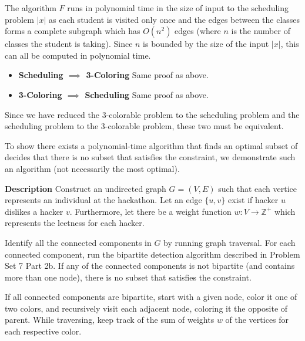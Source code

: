 \documentclass[12pt,twoside]{article}
\begin{document}
\begin{problems}
\begin{problemparts}
\begin{itemize}
  The algorithm $F$ runs in polynomial time in the size of input to the
  scheduling problem $|x|$ as each student is visited only once and the edges
  between the classes forms a complete subgraph which has $O(n^2)$ edges
  (where $n$ is the number of classes the student is taking). Since $n$ is
  bounded by the size of the input $|x|$, this can all be computed in
  polynomial time.

  \begin{itemize}

    \item {\bf Scheduling $\implies$ 3-Coloring} Same proof as above.

    \item {\bf 3-Coloring $\implies$ Scheduling} Same proof as above.

  \end{itemize}

\end{itemize}

Since we have reduced the 3-colorable problem to the scheduling problem and
the scheduling problem to the 3-colorable problem, these two must be
equivalent.

\end{problemparts}

\newpage
\problem  %

\begin{problemparts}

\problempart  %

To show there exists a polynomial-time algorithm that finds an optimal subset
of decides that there is no subset that satisfies the constraint, we
demonstrate such an algorithm (not necessarily the most optimal).

{\bf Description} Construct an undirected graph $G = (V, E)$ such that each
vertice represents an individual at the hackathon. Let an edge $\{u, v\}$
exist if hacker $u$ dislikes a hacker $v$. Furthermore, let there be a
weight function $w : V \longrightarrow \mathbb{Z}^+$ which represents the
leetness for each hacker. 

Identify all the connected components in $G$ by running graph traversal. For
each connected component, run the bipartite detection algorithm described in
Problem Set 7 Part 2b. If any of the connected components is not bipartite
(and contains more than one node), there is no subset that satisfies the
constraint. 

If all connected components are bipartite, start with a given node, color it
one of two colors, and recursively visit each adjacent node, coloring it the
opposite of parent. While traversing, keep track of the sum of weights $w$ of
the vertices for each respective color.


\end{problemparts}
\end{problems}
\end{document}
